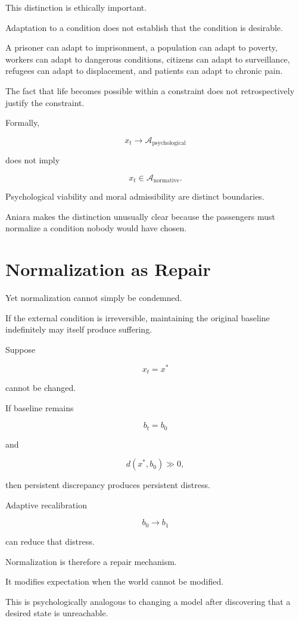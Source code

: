 \documentclass[11pt,oneside]{book}
\theoremstyle{definition}
\theoremstyle{remark}
\newcommand{\A}{\mathcal{A}}
\begin{document}
This distinction is ethically important.

Adaptation to a condition does not establish that the condition is desirable.

A prisoner can adapt to imprisonment, a population can adapt to poverty, workers can adapt to dangerous conditions, citizens can adapt to surveillance, refugees can adapt to displacement, and patients can adapt to chronic pain.

The fact that life becomes possible within a constraint does not retrospectively justify the constraint.

Formally,

\[
x_t\rightarrow\A_{\mathrm{psychological}}
\]

does not imply

\[
x_t\in\A_{\mathrm{normative}}.
\]

Psychological viability and moral admissibility are distinct boundaries.

Aniara makes the distinction unusually clear because the passengers must normalize a condition nobody would have chosen.

\section{Normalization as Repair}

Yet normalization cannot simply be condemned.

If the external condition is irreversible, maintaining the original baseline indefinitely may itself produce suffering.

Suppose

\[
x_t=x^\ast
\]

cannot be changed.

If baseline remains

\[
b_t=b_0
\]

and

\[
d(x^\ast,b_0)\gg0,
\]

then persistent discrepancy produces persistent distress.

Adaptive recalibration

\[
b_0\rightarrow b_1
\]

can reduce that distress.

Normalization is therefore a repair mechanism.

It modifies expectation when the world cannot be modified.

This is psychologically analogous to changing a model after discovering that a desired state is unreachable.
\end{document}
